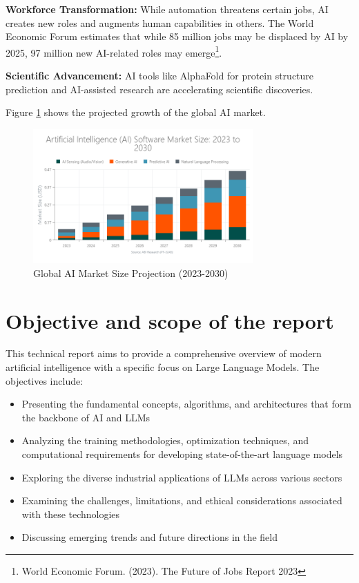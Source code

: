 \documentclass[11pt,a4paper]{report}
\begin{document}
\textbf{Workforce Transformation:} While automation threatens certain jobs, AI creates new roles and augments human capabilities in others. The World Economic Forum estimates that while 85 million jobs may be displaced by AI by 2025, 97 million new AI-related roles may emerge\footnote{World Economic Forum. (2023). The Future of Jobs Report 2023}.

\textbf{Scientific Advancement:} AI tools like AlphaFold for protein structure prediction and AI-assisted research are accelerating scientific discoveries.

Figure \ref{fig:ai-market} shows the projected growth of the global AI market.

\begin{figure}[ht]
    \centering
    \includegraphics[width=0.75\textwidth]{ai_market_growth.png}
    \caption{Global AI Market Size Projection (2023-2030)}
    \label{fig:ai-market}
\end{figure}

\section{Objective and scope of the report}
This technical report aims to provide a comprehensive overview of modern artificial intelligence with a specific focus on Large Language Models. The objectives include:

\begin{itemize}
    \item Presenting the fundamental concepts, algorithms, and architectures that form the backbone of AI and LLMs
    \item Analyzing the training methodologies, optimization techniques, and computational requirements for developing state-of-the-art language models
    \item Exploring the diverse industrial applications of LLMs across various sectors
    \item Examining the challenges, limitations, and ethical considerations associated with these technologies
    \item Discussing emerging trends and future directions in the field
\end{itemize}
\end{document}
